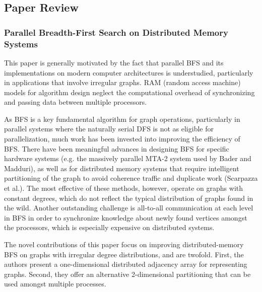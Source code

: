 
\newpage

\subsection{Paper Review}
\subsubsection{Parallel Breadth-First Search on Distributed Memory Systems}

This paper is generally motivated by the fact that parallel BFS and its implementations on modern computer architectures is understudied, particularly in applications that involve irregular graphs. RAM (random access machine) models for algorithm design neglect the computational overhead of synchronizing and passing data between multiple processors. 

As BFS is a key fundamental algorithm for graph operations, particularly in parallel systems where the naturally serial DFS is not as eligible for parallelization, much work has been invested into improving the efficiency of BFS. There have been meaningful advances in designing BFS for specific hardware systems (e.g. the massively parallel MTA-2 system used by Bader and Madduri), as well as for distributed memory systems that require intelligent partitioning of the graph to avoid coherence traffic and duplicate work (Scarpazza et al.). The most effective of these methods, however, operate on graphs with constant degrees, which do not reflect the typical distribution of graphs found in the wild. Another outstanding challenge is all-to-all communication at each level in BFS in order to synchronize knowledge about newly found vertices amongst the processors, which is especially expensive on distributed systems.

The novel contributions of this paper focus on improving distributed-memory BFS on graphs with irregular degree distributions, and are twofold. First, the authors present a one-dimensional distributed adjacency array for representing graphs. Second, they offer an alternative 2-dimensional partitioning that can be used amongst multiple processes.

